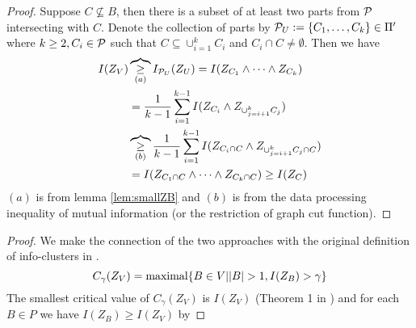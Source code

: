 \documentclass{article}
\begin{document}
\begin{proof}
	Suppose $C \not\subseteq B$, then there is a subset of at least two parts from $\P$ intersecting with $C$. Denote the collection of parts by $\P_U :=\{C_1, \dots, C_k\} \in \Pi'$ where 
	$k \geq 2, C_i \in \P $ such that $C \subseteq \cup_{i=1}^k C_i$ and $C_i \cap C \neq \emptyset$.
	Then we have
\begin{align*}
	I(Z_V) & \overbrace{\geq}_{(a)} I_{\P_U}(Z_U)  = I(Z_{C_1} \wedge \dots \wedge Z_{C_k})\\
	& = {1\over k-1}\sum_{i=1}^{k-1} I(Z_{C_i} \wedge Z_{\cup_{j=i+1}^k C_j}) \\
	& \overbrace{\geq}_{(b)} \frac{1}{k-1}\sum_{i=1}^{k-1} I(Z_{C_i \cap C} \wedge Z_{\cup_{j=i+1}^k C_j \cap C}) \\
	& = I(Z_{C_1 \cap C} \wedge \dots \wedge Z_{C_k \cap C}) \geq I(Z_C)
\end{align*}
$(a)$ is from lemma \ref{lem:smallZB} and $(b)$ is from the data processing inequality of mutual information (or the restriction of graph cut function).
\end{proof}
\begin{proof}
We make the connection of the two approaches with the original definition of info-clusters in \cite{RN1}.
\begin{equation}\label{eq:def_CgammaZV}
C_{\gamma}(Z_V) = \textrm{maximal}\{ B \in V \vert \abs{B} > 1, I(Z_B) > \gamma \}
\end{equation}
The smallest critical value of $C_{\gamma}(Z_V)$ is $I(Z_V)$ (Theorem 1 in \cite{RN1}) and for each $B \in P$ we have $I(Z_B) \geq I(Z_V)$ by 
\end{proof}


\end{document}
